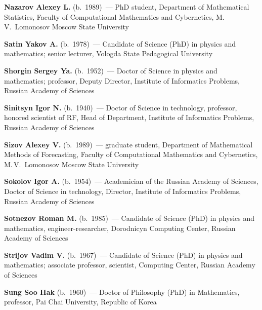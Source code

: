 \begin{multicols}{2}
\noindent
\textbf{Nazarov Alexey L.} (b.\ 1989)~--- PhD student,
Department of Mathematical Statistics, 
Faculty of Computational Mathematics and Cybernetics, 
M.\,V.~Lomonosov Moscow State University

\vspace*{4pt}

\noindent
\textbf{Satin Yakov A.} (b.\ 1978)~--- Candidate of Science (PhD) in physics 
and mathematics; senior lecturer, Vologda State Pedagogical University

\vspace*{4pt}


\noindent
\textbf{Shorgin Sergey Ya.} (b.\ 1952)~--- Doctor of Science in physics 
and mathematics; professor, Deputy Director,
Institute of Informatics Problems, Russian Academy of Sciences

\vspace*{4pt}

\noindent
\textbf{Sinitsyn Igor N.} (b.\ 1940)~--- Doctor of Science in technology, 
professor, honored scientist of RF, Head of Department,
Institute of Informatics Problems, Russian Academy of Sciences

\vspace*{4pt}

\noindent
\textbf{Sizov Alexey V.} (b.\ 1989)~--- 
graduate student,
Department of Mathematical Methods of Forecasting,
Faculty of Computational Mathematics and Cybernetics, 
M.\,V.~Lomonosov Moscow State University

\vspace*{4pt}

\noindent 
\textbf{Sokolov Igor A.} (b.\ 1954)~--- Academician of the Russian Academy of Sciences,
Doctor of Science in technology, Director,
Institute of Informatics Problems,  Russian Academy of Sciences


\columnbreak

\noindent
\textbf{Sotnezov Roman M.} (b.\ 1985)~--- 
Candidate of Science (PhD) in physics and mathematics, engineer-researcher,
Dorodnicyn Computing Center, Russian Academy of Sciences 

\vspace*{4pt}

\noindent
\textbf{Strijov Vadim V.} (b.\ 1967)~--- Candidate of Science (PhD)
in physics  and mathematics; associate professor, scientist, Computing Center, 
Russian Academy of Sciences

\vspace*{4pt}

\noindent
\textbf{Sung Soo Hak} (b.\ 1960)~--- Doctor of Philosophy (PhD) in Mathematics,
professor, Pai Chai University, Republic of Korea


\end{multicols}
